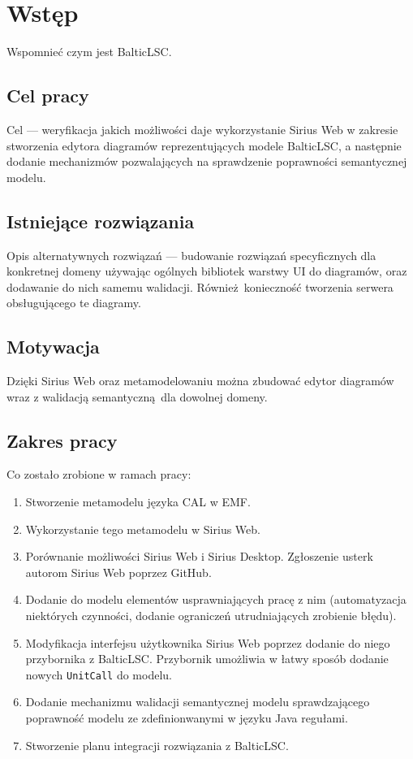 \chapter{Wstęp}

Wspomnieć czym jest BalticLSC.

\section{Cel pracy}

Cel --- weryfikacja jakich możliwości daje wykorzystanie Sirius Web w zakresie
stworzenia edytora diagramów reprezentujących modele BalticLSC, a następnie
dodanie mechanizmów pozwalających na sprawdzenie poprawności semantycznej
modelu.

\section{Istniejące rozwiązania}

Opis alternatywnych rozwiązań --- budowanie rozwiązań specyficznych dla
konkretnej domeny używając ogólnych bibliotek warstwy UI do diagramów, oraz
dodawanie do nich samemu walidacji. Również konieczność tworzenia serwera
obsługującego te diagramy.

\section{Motywacja}

Dzięki Sirius Web oraz metamodelowaniu można zbudować edytor diagramów wraz z
walidacją semantyczną dla dowolnej domeny.

\section{Zakres pracy}

Co zostało zrobione w ramach pracy:

\begin{enumerate}
	\item Stworzenie metamodelu języka CAL w EMF\@.
	\item Wykorzystanie tego metamodelu w Sirius Web.
	\item Porównanie możliwości Sirius Web i Sirius Desktop. Zgłoszenie usterk autorom Sirius Web poprzez GitHub.
	\item Dodanie do modelu elementów usprawniających pracę z nim (automatyzacja niektórych czynności, dodanie ograniczeń utrudniających zrobienie błędu).
	\item Modyfikacja interfejsu użytkownika Sirius Web poprzez dodanie do niego przybornika z BalticLSC\@. Przybornik umożliwia w łatwy sposób dodanie nowych \texttt{UnitCall} do modelu.
	\item Dodanie mechanizmu walidacji semantycznej modelu sprawdzającego poprawność modelu ze zdefinionwanymi w języku Java regułami.
	\item Stworzenie planu integracji rozwiązania z BalticLSC\@.
\end{enumerate}

